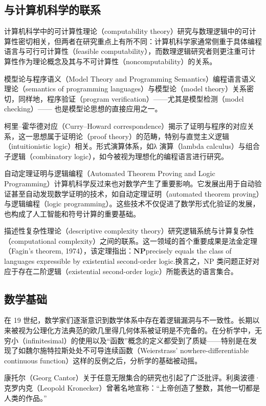 \subsection{与计算机科学的联系}
计算机科学中的可计算性理论（computability theory）研究与数理逻辑中的可计算性密切相关，但两者在研究重点上有所不同：计算机科学家通常侧重于具体编程语言与可行可计算性（feasible computability），而数理逻辑研究者则更注重可计算性作为理论概念及其与不可计算性（noncomputability）的关系。

模型论与程序语义（Model Theory and Programming Semantics）编程语言语义理论（semantics of programming languages）与模型论（model theory）关系密切，同样地，程序验证（program verification）——尤其是模型检测（model checking）—— 也是模型论思想的直接应用之一。  

柯里–霍华德对应（Curry–Howard correspondence）揭示了证明与程序的对应关系，这一思想属于证明论（proof theory）的范畴，特别与直觉主义逻辑（intuitionistic logic）相关。形式演算体系，如λ 演算（lambda calculus）与组合子逻辑（combinatory logic），如今被视为理想化的编程语言进行研究。

自动定理证明与逻辑编程（Automated Theorem Proving and Logic Programming）计算机科学反过来也对数学产生了重要影响。它发展出用于自动验证甚至自动发现数学证明的技术，如自动定理证明（automated theorem proving）与逻辑编程（logic programming）。这些技术不仅促进了数学形式化验证的发展，也构成了人工智能和符号计算的重要基础。

描述性复杂性理论（descriptive complexity theory）研究逻辑系统与计算复杂性（computational complexity）之间的联系。这一领域的首个重要成果是法金定理（Fagin’s theorem, 1974），该定理指出：$\mathbf{NP}$precisely equals the class of languages expressible by existential second-order logic.换言之，NP 类问题正好对应于存在二阶逻辑（existential second-order logic）所能表达的语言集合。
\subsection{数学基础}
在 19 世纪，数学家们逐渐意识到数学体系中存在着逻辑漏洞与不一致性。长期以来被视为公理化方法典范的欧几里得几何体系被证明是不完备的。在分析学中，无穷小（infinitesimal）的使用以及“函数”概念的定义都受到了质疑——特别是在发现了如魏尔施特拉斯处处不可导连续函数（Weierstrass’ nowhere-differentiable continuous function）这样的反例之后，分析学的基础被动摇。

康托尔（Georg Cantor）关于任意无限集合的研究也引起了广泛批评。利奥波德·克罗内克（Leopold Kronecker）曾著名地宣称：“上帝创造了整数，其他一切都是人类的作品。”


